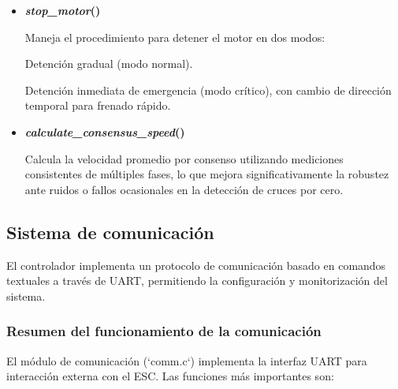 \begin{itemize}
\item \textbf{\textit{stop\_motor}()} \par
Maneja el procedimiento para detener el motor en dos modos:

Detención gradual (modo normal).

Detención inmediata de emergencia (modo crítico), con cambio de dirección temporal para frenado rápido.


\item \textbf{\textit{calculate\_consensus\_speed}()} \par
Calcula la velocidad promedio por consenso utilizando mediciones consistentes de múltiples fases, lo que mejora significativamente la robustez ante ruidos o fallos ocasionales en la detección de cruces por cero.


\end{itemize}

\subsection{Sistema de comunicación}

El controlador implementa un protocolo de comunicación basado en comandos textuales a través de UART, permitiendo la configuración y monitorización del sistema.

\subsubsection{Resumen del funcionamiento de la comunicación}

El módulo de comunicación (`comm.c`) implementa la interfaz UART para interacción externa con el ESC. Las funciones más importantes son:

